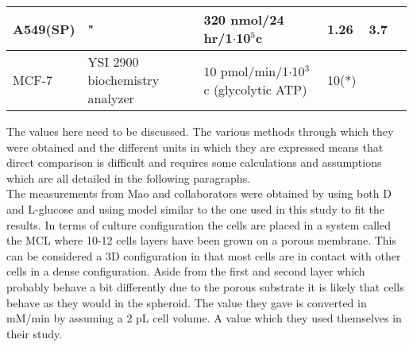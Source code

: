 \documentclass[11pt,a4paper]{article}
\begin{document}
\begin{table}[h!]
\begin{center}
\begin{tabular}{ |p{18mm}|p{26mm}|p{35mm}|p{20mm}|p{25mm}|p{7mm}| }
 \hline
   A549(SP) & " & 320 nmol/24 hr/1$\cdot$10$^{5}$c  & 1.26 & 3.7 & \cite{Liu2013}\\
 \hline
 \hline
   MCF-7 &  YSI 2900 biochemistry analyzer  & 10 pmol/min/1$\cdot$10$^{3}$c (glycolytic ATP) & 10(*) & \cite{Prado-Garcia2020}\cite{Gardner2022}\\
 \hline

 
 \end{tabular}
 \end{center}
 \end{table}
The values here need to be discussed. The various methods through which they were obtained and the different units in which they are expressed means that direct comparison is difficult and requires some calculations and assumptions which are all detailed in the following paragraphs.\\
 
The measurements from Mao and collaborators were obtained by using both  D and L-glucose and using model similar to the one used in this study to fit the results. In terms of culture configuration the cells are placed in a system called the MCL where 10-12 cells layers have been grown on a porous membrane. This can be considered a 3D configuration in that most cells are in contact with other cells in a dense configuration. Aside from the first and second layer which probably behave a bit differently due to the porous substrate it is likely that cells behave as they would in the spheroid. The value they gave is converted in mM/min by assuming a 2 pL cell volume. A value which they used themselves in their study.\\
 
\end{document}
